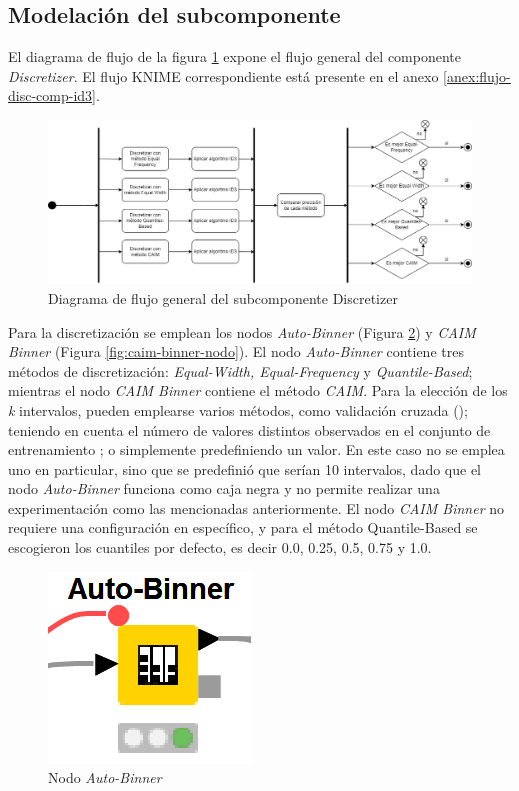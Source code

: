 \subsection{Modelación del subcomponente}
El diagrama de flujo de la figura \ref{fig:diagrama-flujo-discretizer} expone el flujo general del componente \textit{Discretizer}. El flujo KNIME correspondiente está presente en el anexo \ref{anex:flujo-disc-comp-id3}.

\begin{figure}[H]
	\centering
	\includegraphics[width=0.7\linewidth]{"figuras/capi 2/diagrama-flujo-discretizer"}
	\caption[Diagrama de flujo general del subcomponente Discretizer]{Diagrama de flujo general del subcomponente Discretizer}
	\label{fig:diagrama-flujo-discretizer}
\end{figure}

Para la discretización se emplean los nodos \textit{Auto-Binner} (Figura \ref{fig:auto-binner-nodo}) y \textit{CAIM Binner} (Figura \ref{fig:caim-binner-nodo}). El nodo \textit{Auto-Binner} contiene tres métodos de discretización: \textit{Equal-Width, Equal-Frequency} y \textit{Quantile-Based}; mientras el nodo \textit{CAIM Binner} contiene el método \textit{CAIM}. Para la elección de los \textit{k} intervalos, pueden emplearse varios métodos, como validación cruzada (\cite{torgo1997search}); teniendo en cuenta el número de valores distintos observados en el conjunto de entrenamiento \citep{dougherty1995supervised}; o simplemente predefiniendo un valor. En este caso no se emplea uno en particular, sino que se predefinió que serían 10 intervalos, dado que el nodo \textit{Auto-Binner} funciona como caja negra y no permite realizar una experimentación como las mencionadas anteriormente. El nodo \textit{CAIM Binner} no requiere una configuración en específico, y para el método Quantile-Based se escogieron los cuantiles por defecto, es decir 0.0, 0.25, 0.5, 0.75 y 1.0.\\

\begin{figure}[H]
	\centering
	\includegraphics[width=0.15\linewidth]{"figuras/capi 2/auto-binner-nodo"}
	\caption[Nodo Auto-Binner]{Nodo \textit{Auto-Binner}}
	\label{fig:auto-binner-nodo}
\end{figure}

